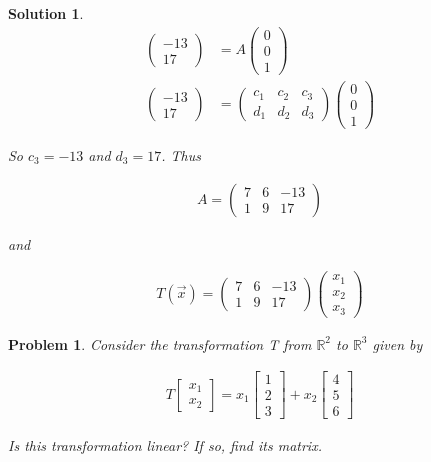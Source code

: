 \documentclass{article}
\newtheorem{problem}{Problem}
\newtheorem*{solution}{Solution}
\begin{document}
\begin{solution}
\begin{align*}
\begin{pmatrix}
-13 \\ 17
\end{pmatrix}
&= A \begin{pmatrix} 0 \\ 0 \\ 1 \end{pmatrix} \\
\begin{pmatrix}
-13 \\ 17
\end{pmatrix}
&= 
\begin{pmatrix} 
c_{1} & c_{2} & c_{3} \\
d_{1} & d_{2} & d_{3}
\end{pmatrix}
\begin{pmatrix} 0 \\ 0 \\ 1 \end{pmatrix}
\end{align*}

So $c_{3} = -13$ and $d_{3} = 17$. Thus 

\begin{align*}
A = 
\begin{pmatrix}
7 & 6 & -13\\
1 & 9 & 17
\end{pmatrix}
\end{align*}

and 

\begin{align*}
T(\vec{x}) = \begin{pmatrix}
7 & 6 & -13\\
1 & 9 & 17
\end{pmatrix}
\begin{pmatrix}
x_{1} \\ x_{2} \\ x_{3}
\end{pmatrix}
\end{align*}

\end{solution}

\begin{problem}
Consider the transformation T from $\mathbb{R}^2$ to $\mathbb{R}^3$ given by

\begin{align*}
T\begin{bmatrix}x_{1} \\ x_{2} \end{bmatrix} = x_{1} \begin{bmatrix}1 \\ 2 \\ 3 \end{bmatrix} + x_{2} \begin{bmatrix}4 \\ 5 \\ 6 \end{bmatrix}
\end{align*}

Is this transformation linear? If so, find its matrix.
\end{problem}
\end{document}
